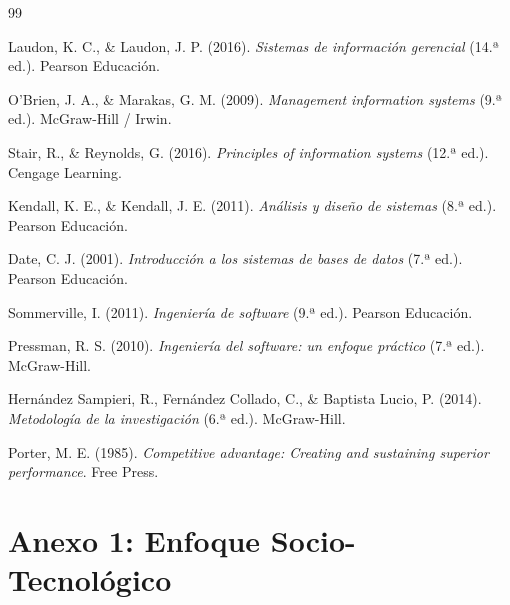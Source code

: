 \documentclass[12pt,a4paper,oneside]{report}
\begin{document}
\begin{thebibliography}{99}

Laudon, K. C., \& Laudon, J. P. (2016).
\textit{Sistemas de información gerencial} (14.ª ed.).
Pearson Educación.

O'Brien, J. A., \& Marakas, G. M. (2009).
\textit{Management information systems} (9.ª ed.).
McGraw-Hill / Irwin.

Stair, R., \& Reynolds, G. (2016).
\textit{Principles of information systems} (12.ª ed.).
Cengage Learning.

Kendall, K. E., \& Kendall, J. E. (2011).
\textit{Análisis y diseño de sistemas} (8.ª ed.).
Pearson Educación.

Date, C. J. (2001).
\textit{Introducción a los sistemas de bases de datos} (7.ª ed.).
Pearson Educación.

Sommerville, I. (2011).
\textit{Ingeniería de software} (9.ª ed.).
Pearson Educación.

Pressman, R. S. (2010).
\textit{Ingeniería del software: un enfoque práctico} (7.ª ed.).
McGraw-Hill.

Hernández Sampieri, R., Fernández Collado, C., \& Baptista Lucio, P. (2014).
\textit{Metodología de la investigación} (6.ª ed.).
McGraw-Hill.

Porter, M. E. (1985).
\textit{Competitive advantage: Creating and sustaining superior performance}.
Free Press.

\end{thebibliography}

\appendix
{}

\chapter*{Anexo 1: Enfoque Socio-Tecnol\'ogico}
\end{document}
